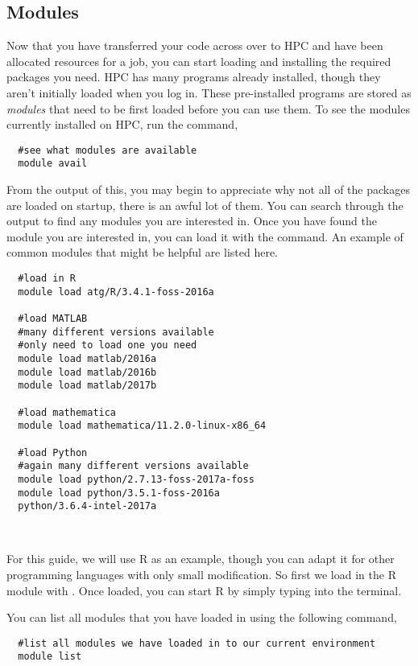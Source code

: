 \subsection{Modules}
Now that you have transferred your code across over to HPC and have been allocated resources for a job, you can start loading and installing the required packages you need. HPC has many programs already installed, though they aren't initially loaded when you log in. These pre-installed programs are stored as \textit{modules} that need to be first loaded before you can use them. To see the modules currently installed on HPC, run the command,
%
%
\\
\par
\begin{verbatim}
  #see what modules are available
  module avail
\end{verbatim}
From the output of this, you may begin to appreciate why not all of the packages are loaded on startup, there is an awful lot of them. You can search through the output to find any modules you are interested in. Once you have found the module you are interested in, you can load it with the  command. An example of common modules that might be helpful are listed here.
%
\\
%
\begin{verbatim}
  #load in R
  module load atg/R/3.4.1-foss-2016a

  #load MATLAB
  #many different versions available
  #only need to load one you need
  module load matlab/2016a 
  module load matlab/2016b 
  module load matlab/2017b

  #load mathematica
  module load mathematica/11.2.0-linux-x86_64

  #load Python
  #again many different versions available
  module load python/2.7.13-foss-2017a-foss
  module load python/3.5.1-foss-2016a
  python/3.6.4-intel-2017a
\end{verbatim}
%
\\
\par
%
For this guide, we will use R as an example, though you can adapt it for other programming languages with only small modification. So first we load in the R module with . Once loaded, you can start R by simply typing  into the terminal.
%
%
%
\par
You can list all modules that you have loaded in using the following command,
\\
\par
\begin{verbatim}
  #list all modules we have loaded in to our current environment
  module list
\end{verbatim}


